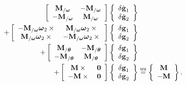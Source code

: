 \documentclass[10pt,dvips,fleqn,subeqn]{report}
\newcommand{\T}[1]{\bm{\mathbf{#1}}}
\newcommand{\equu}{\overset{\text{uu}}{=}}
\begin{document}
\begin{align}
	\sqbr{\matr{cc}{
		\T{M}_{/\T{\omega}} & - \T{M}_{/\T{\omega}} \\
		- \T{M}_{/\T{\omega}} & \T{M}_{/\T{\omega}}
	}}\cubr{\cvvect{
		\delta\dot{\T{g}}_1 \\
		\delta\dot{\T{g}}_2
	}} & \nonumber \\
	+ \sqbr{\matr{cc}{
		- \T{M}_{/\T{\omega}} \T{\omega}_2 \times{} & \T{M}_{/\T{\omega}} \T{\omega}_2 \times{} \\
		\T{M}_{/\T{\omega}} \T{\omega}_2 \times{} & - \T{M}_{/\T{\omega}} \T{\omega}_2 \times{}
	}} \cubr{\cvvect{
		\delta\T{g}_1 \\
		\delta\T{g}_2 
	}} & \nonumber \\
	+ \sqbr{\matr{cc}{
		\T{M}_{/\T{\theta}} & - \T{M}_{/\T{\theta}} \\
		- \T{M}_{/\T{\theta}} & \T{M}_{/\T{\theta}}
	}} \cubr{\cvvect{
		\delta\T{g}_1 \\
		\delta\T{g}_2 
	}} & \nonumber \\
	+ \sqbr{\matr{cc}{
		\T{M}\times{} & \T{0} \\
		- \T{M}\times{} & \T{0}
	}} \cubr{\cvvect{
		\delta\T{g}_1 \\
		\delta\T{g}_2 
	}} &\equu \cubr{\cvvect{
		\T{M} \\
		- \T{M}
	}} .
\end{align}
\end{document}
